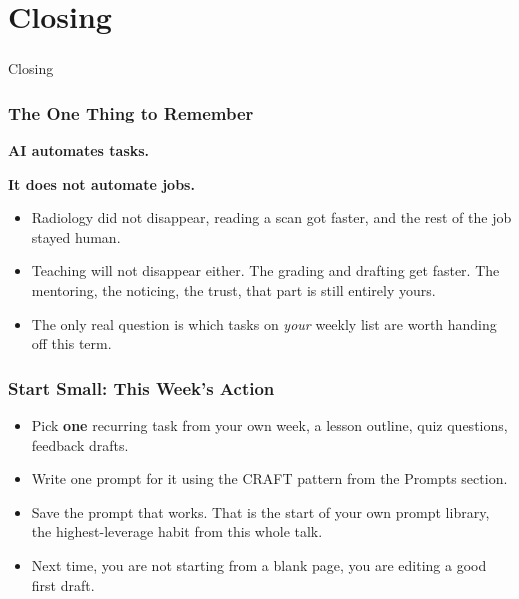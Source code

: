 \section[Concl]{Closing}

\begin{frame}[fragile]\frametitle{}
\begin{center}
{\Large Closing}
\end{center}
\end{frame}

\begin{frame}[fragile]\frametitle{The One Thing to Remember}
\begin{center}
\Large
\textbf{AI automates tasks.}

\medskip
\textbf{It does not automate jobs.}
\end{center}

\medskip
\begin{itemize}
\item Radiology did not disappear, reading a scan got faster, and the rest of the job stayed human.
\item Teaching will not disappear either. The grading and drafting get faster. The mentoring, the noticing, the trust, that part is still entirely yours.
\item The only real question is which tasks on \emph{your} weekly list are worth handing off this term.
\end{itemize}
\end{frame}

\begin{frame}[fragile]\frametitle{Start Small: This Week's Action}
\begin{itemize}
\item Pick \textbf{one} recurring task from your own week, a lesson outline, quiz questions, feedback drafts.
\item Write one prompt for it using the CRAFT pattern from the Prompts section.
\item Save the prompt that works. That is the start of your own prompt library, the highest-leverage habit from this whole talk.
\item Next time, you are not starting from a blank page, you are editing a good first draft.
\end{itemize}
\end{frame}

